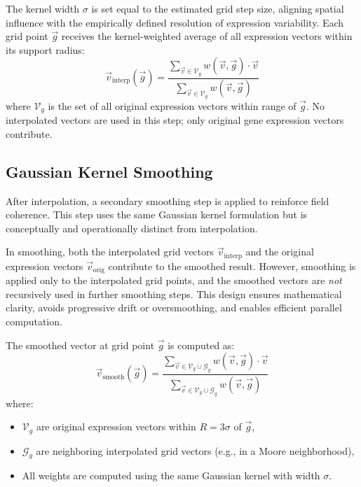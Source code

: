         The kernel width \( \sigma \) is set equal to the estimated grid step size, aligning spatial influence with the empirically defined resolution of expression variability. Each grid point \( \vec{g} \) receives the kernel-weighted average of all expression vectors within its support radius:
        \[
            \vec{v}_{\text{interp}}(\vec{g}) = \frac{\sum_{\vec{v} \in \mathcal{V}_g} w(\vec{v}, \vec{g}) \cdot \vec{v}}{\sum_{\vec{v} \in \mathcal{V}_g} w(\vec{v}, \vec{g})}
        \]
        where \( \mathcal{V}_g \) is the set of all original expression vectors within range of \( \vec{g} \). No interpolated vectors are used in this step; only original gene expression vectors contribute.

    \subsection{Gaussian Kernel Smoothing}

        After interpolation, a secondary smoothing step is applied to reinforce field coherence. This step uses the same Gaussian kernel formulation but is conceptually and operationally distinct from interpolation.

        In smoothing, both the interpolated grid vectors \( \vec{v}_{\text{interp}} \) and the original expression vectors \( \vec{v}_{\text{orig}} \) contribute to the smoothed result. However, smoothing is applied only to the interpolated grid points, and the smoothed vectors are \emph{not} recursively used in further smoothing steps. This design ensures mathematical clarity, avoids progressive drift or oversmoothing, and enables efficient parallel computation.

        The smoothed vector at grid point \( \vec{g} \) is computed as:
        \[
            \vec{v}_{\text{smooth}}(\vec{g}) = \frac{\sum_{\vec{v} \in \mathcal{V}_g \cup \mathcal{G}_g} w(\vec{v}, \vec{g}) \cdot \vec{v}}{\sum_{\vec{v} \in \mathcal{V}_g \cup \mathcal{G}_g} w(\vec{v}, \vec{g})}
        \]
        where:
        \begin{itemize}
            \item \( \mathcal{V}_g \) are original expression vectors within \( R = 3\sigma \) of \( \vec{g} \),
            \item \( \mathcal{G}_g \) are neighboring interpolated grid vectors (e.g., in a Moore neighborhood),
            \item All weights are computed using the same Gaussian kernel with width \( \sigma \).
        \end{itemize}

